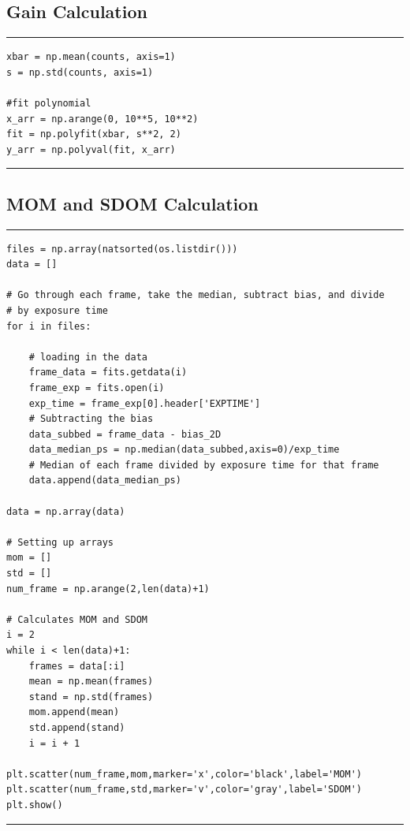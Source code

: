 \documentclass[preprint]{aastex62}
\begin{document}
\subsection{Gain Calculation} \label{code:gain} 
\hrule
\begin{lstlisting}
xbar = np.mean(counts, axis=1)
s = np.std(counts, axis=1)

#fit polynomial
x_arr = np.arange(0, 10**5, 10**2)
fit = np.polyfit(xbar, s**2, 2)
y_arr = np.polyval(fit, x_arr)
\end{lstlisting}
\hrule \vspace{7pt}

\subsection{MOM and SDOM Calculation} \label{code:mom_sdom} 
\hrule
\begin{lstlisting}
files = np.array(natsorted(os.listdir()))
data = []

# Go through each frame, take the median, subtract bias, and divide 
# by exposure time
for i in files:

    # loading in the data
    frame_data = fits.getdata(i)
    frame_exp = fits.open(i)
    exp_time = frame_exp[0].header['EXPTIME']
    # Subtracting the bias
    data_subbed = frame_data - bias_2D
    data_median_ps = np.median(data_subbed,axis=0)/exp_time
    # Median of each frame divided by exposure time for that frame
    data.append(data_median_ps)
   
data = np.array(data)

# Setting up arrays 
mom = []
std = []
num_frame = np.arange(2,len(data)+1)

# Calculates MOM and SDOM 
i = 2
while i < len(data)+1:
    frames = data[:i]
    mean = np.mean(frames) 
    stand = np.std(frames)
    mom.append(mean)
    std.append(stand)
    i = i + 1

plt.scatter(num_frame,mom,marker='x',color='black',label='MOM')
plt.scatter(num_frame,std,marker='v',color='gray',label='SDOM')
plt.show()
\end{lstlisting}
\hrule \vspace{7pt}

% 

\end{document}
